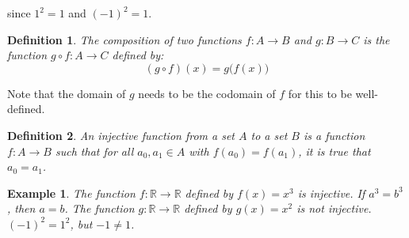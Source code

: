 \documentclass{article}
\theoremstyle{plain}
\theoremstyle{normal}
\newtheorem{definition}{Definition}[section]
\newtheorem{example}{Example}[section]
\begin{document}
        since $1^{2}=1$ and $(-1)^{2}=1$.
        \begin{definition}
            The composition of two functions $f:A\rightarrow{B}$ and
            $g:B\rightarrow{C}$ is the function $g\circ{f}:A\rightarrow{C}$
            defined by:
            \begin{equation}
                (g\circ{f})(x)=g\big(f(x)\big)
            \end{equation}
        \end{definition}
        Note that the domain of $g$ needs to be the codomain of $f$ for this
        to be well-defined.
        \begin{definition}
            An injective function from a set $A$ to a set $B$ is a function
            $f:A\rightarrow{B}$ such that for all $a_{0},a_{1}\in{A}$ with
            $f(a_{0})=f(a_{1})$, it is true that $a_{0}=a_{1}$.
        \end{definition}
        \begin{example}
            The function $f:\mathbb{R}\rightarrow\mathbb{R}$ defined by
            $f(x)=x^{3}$ is injective. If $a^{3}=b^{3}$, then $a=b$. The
            function $g:\mathbb{R}\rightarrow\mathbb{R}$ defined by
            $g(x)=x^{2}$ is not injective. $(-1)^{2}=1^{2}$, but
            $-1\ne{1}$.
        \end{example}
\end{document}
